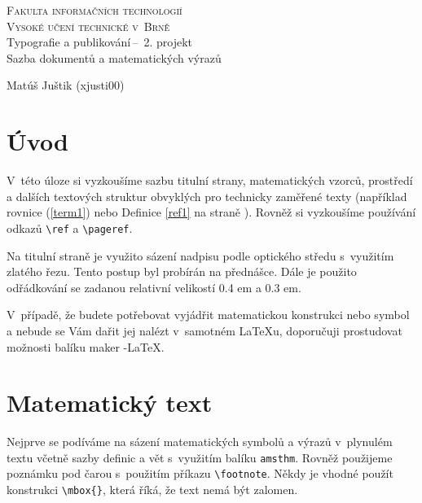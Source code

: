 \documentclass[a4paper, 11pt, twocolumn]{article}
\begin{document}
  
  \begin{titlepage}
    \begin{center} 
    \Huge
    \textsc{Fakulta informačních technologií \\ Vysoké učení technické v~Brně\\}
    \LARGE Typografie a publikování\,--\ 2. projekt \\ Sazba dokumentů a matematických výrazů
    \end{center}
    \Large \the \year \hfill Matúš Juštik (xjusti00)

  \end{titlepage}
  

  \section*{Úvod}
V~této úloze si vyzkoušíme sazbu titulní strany, matematic\-kých vzorců, prostředí a dalších textových 
struktur obvyklých pro technicky zaměřené texty (například rovnice (\ref{term1})
nebo Definice \ref{ref1} na straně \pageref{ref1}). Rovněž si vyzkoušíme používání odkazů \verb|\ref| a \verb|\pageref|.\par
Na titulní straně je využito sázení nadpisu podle optického středu s~využitím zlatého řezu. Tento postup byl
probírán na přednášce. Dále je použito odřádkování se
zadanou relativní velikostí 0.4 em a 0.3 em.\par
V~případě, že budete potřebovat vyjádřit matematickou
konstrukci nebo symbol a nebude se Vám dařit jej nalézt
v~samotném \LaTeX u, doporučuji prostudovat možnosti balíku maker \AmS-\LaTeX.
  
  \section{Matematický text}
Nejprve se podíváme na sázení matematických symbolů a výrazů v~plynulém textu včetně sazby
definic a vět\- s~vy\-užitím balíku \verb|amsthm|. Rovněž použijeme poznámku pod čarou s~použitím příkazu
\verb|\footnote|. Někdy je vhodné použít konstrukci \verb|\mbox{}|, která říká, že text nemá být zalomen.
\end{document}
